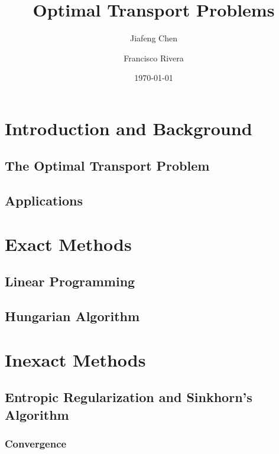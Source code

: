 \documentclass[11pt,reqno]{amsart}
\title{Optimal Transport Problems}
\author{Jiafeng Chen\and Francisco Rivera}
\date{\today}
\theoremstyle{definition}
\theoremstyle{remark}
\begin{document}
\maketitle

\section{Introduction and Background}

\subsection{The Optimal Transport Problem}

\subsection{Applications} %
\label{sub:applications}


\section{Exact Methods}


\subsection{Linear Programming} %
\label{sub:linear_programming}


\subsection{Hungarian Algorithm} %
\label{sub:hungarian_algorithm}


\section{Inexact Methods} %
\label{sec:inexact_methods}

\subsection{Entropic Regularization and Sinkhorn's Algorithm} %
\label{sub:entropic_regularization_and_sinkhorn_s_algorithm}

\subsubsection{Convergence}
\end{document}
